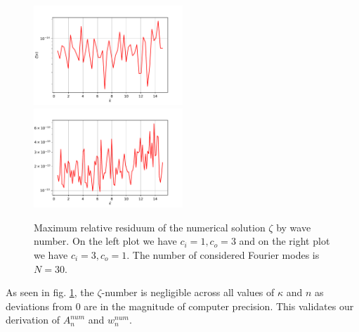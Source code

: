 \documentclass[12pt,journal,compsoc, onecolumn]{IEEEtran}
\begin{document}
\begin{figure}
    \includegraphics[width=0.5\textwidth]{validate_sol_c_i1.0c_o3.0N_30plotRangeStart_0.5plotRangeEnd_15.0.pdf}
    \includegraphics[width=0.5\textwidth]{validate_p_c_i3.0c_o1.0N_100plotRangeStart_0.5plotRangeEnd_15.0.pdf}
    \caption{Maximum relative residuum of the numerical solution $\zeta$ by wave number. 
    On the left plot we have $c_i = 1, c_o = 3$
    and on the right plot we have $c_i = 3, c_o = 1$. The number of considered Fourier modes is $N = 30$.}
    \label{fig:sol_validation}
\end{figure}
\noindent
As seen in fig. \ref{fig:sol_validation}, the $\zeta$-number is negligible across all values of $\kappa$ and $n$ as deviations from $0$ are in the magnitude of computer precision. This validates our derivation of $A_n^{num}$ and $w_n^{num}$.
\end{document}
